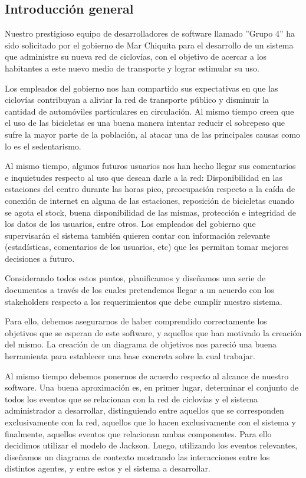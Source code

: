 \subsection{Introducción general}

Nuestro prestigioso equipo de desarrolladores de software llamado ''Grupo 4'' ha sido solicitado por el gobierno de
Mar Chiquita para el desarrollo de un sistema que administre su nueva red de ciclovías, con el objetivo de acercar
a los habitantes a este nuevo medio de transporte y lograr estimular su uso.

Los empleados del gobierno nos han compartido sus expectativas en que las ciclovías contribuyan a aliviar la 
red de transporte público y disminuir la cantidad de automóviles particulares en circulación. Al mismo tiempo
creen que el uso de las bicicletas es una buena manera intentar reducir el sobrepeso que sufre la mayor parte 
de la población, al atacar una de las principales causas como lo es el sedentarismo. 

Al mismo tiempo, algunos futuros usuarios nos han hecho llegar sus comentarios e inquietudes respecto al uso que
desean darle a la red: Disponibilidad en las estaciones del centro durante las horas pico, preocupación respecto
a la caída de conexión de internet en alguna de las estaciones, reposición de bicicletas cuando se agota el stock,
buena disponibilidad de las mismas, protección e integridad de los datos de los usuarios, entre otros. 
Los empleados del gobierno que supervisarán el sistema también quieren contar con información relevante (estadísticas,
comentarios de los usuarios, etc) que les permitan tomar mejores decisiones a futuro.

Considerando todos estos puntos, planificamos y diseñamos una serie de documentos a través de los cuales pretendemos 
llegar a un acuerdo con los stakeholders respecto a los requerimientos que debe cumplir nuestro sistema.

Para ello, debemos asegurarnos
de haber comprendido correctamente los objetivos que se esperan de este software, y aquellos que han motivado la
creación del mismo. La creación de un diagrama de objetivos nos pareció una buena herramienta para establecer
una base concreta sobre la cual trabajar.

Al mismo tiempo debemos ponernos de acuerdo respecto al alcance de nuestro software.
Una buena aproximación es, en primer lugar, determinar el conjunto de todos los eventos que se relacionan con 
la red de ciclovías y el sistema administrador a desarrollar, distinguiendo entre aquellos que se corresponden 
exclusivamente con la red, aquellos que lo hacen exclusivamente con el sistema y finalmente, aquellos 
eventos que relacionan ambas componentes. Para ello decidimos utilizar el modelo de Jackson.
Luego, utilizando los eventos relevantes, diseñamos un diagrama de contexto mostrando
las interacciones entre los distintos agentes, y entre estos y el sistema a desarrollar.